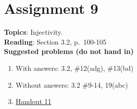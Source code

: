 \documentclass[12pt]{article}
\begin{document}
\newpage
\section[9 (due April 5): Injectivity.]{Assignment 9}

\textbf{Topics}: Injectivity.
\\

\noindent \textbf{Reading}: Section 3.2, p.~100-105
\\





\noindent \textbf{Suggested problems (do not hand in)}

\begin{enumerate}
\item With answers: 3.2, \#12(adg), \#13(bd)
\item Without answers: 3.2 \#9-14, 19(abc)
\item \href{https://www.math.emory.edu/~dzb/teaching/250Fall2021/handouts/250-H11-injectivity.pdf}{Handout 11}
\end{enumerate}
\end{document}
